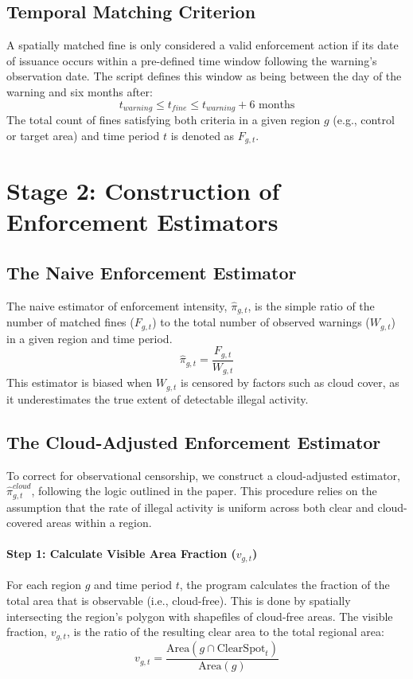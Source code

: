 \documentclass[12pt]{article}
\begin{document}
\begin{appendices}
\subsection*{Temporal Matching Criterion}
A spatially matched fine is only considered a valid enforcement action if its date of issuance occurs within a pre-defined time window following the warning's observation date. The script defines this window as being between the day of the warning and six months after:
$$
t_{warning} \leqslant t_{fine} \leqslant t_{warning} + 6 \text{ months}
$$
The total count of fines satisfying both criteria in a given region $g$ (e.g., control or target area) and time period $t$ is denoted as $F_{g,t}$.

\section*{Stage 2: Construction of Enforcement Estimators}

\subsection*{The Naive Enforcement Estimator}
The naive estimator of enforcement intensity, $\hat{\pi}_{g,t}$, is the simple ratio of the number of matched fines ($F_{g,t}$) to the total number of observed warnings ($W_{g,t}$) in a given region and time period.
\begin{equation}
\hat{\pi}_{g,t} = \frac{F_{g,t}}{W_{g,t}}
\end{equation}
This estimator is biased when $W_{g,t}$ is censored by factors such as cloud cover, as it underestimates the true extent of detectable illegal activity.

\subsection*{The Cloud-Adjusted Enforcement Estimator}
To correct for observational censorship, we construct a cloud-adjusted estimator, $\hat{\pi}_{g,t}^{cloud}$, following the logic outlined in the paper. This procedure relies on the assumption that the rate of illegal activity is uniform across both clear and cloud-covered areas within a region.

\paragraph{Step 1: Calculate Visible Area Fraction ($v_{g,t}$)}
For each region $g$ and time period $t$, the program calculates the fraction of the total area that is observable (i.e., cloud-free). This is done by spatially intersecting the region's polygon with shapefiles of cloud-free areas. The visible fraction, $v_{g,t}$, is the ratio of the resulting clear area to the total regional area:
$$
v_{g,t} = \frac{\text{Area}(g \cap \text{ClearSpot}_t)}{\text{Area}(g)}
$$



\end{appendices}
\end{document}
